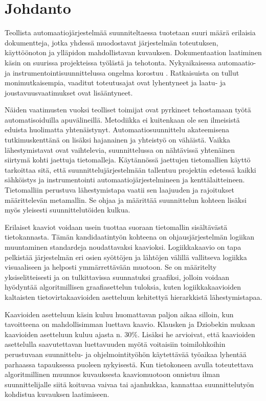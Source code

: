\documentclass[finnish,12pt]{article}
\begin{document}
	\cleardoublepage
	\storeinipagenumber
	\setcounter{page}{1}


	\section{Johdanto}
	\thispagestyle{empty}

Teollista automaatiojärjestelmää suunniteltaessa tuotetaan suuri määrä erilaisia dokumentteja, jotka
yhdessä muodostavat järjestelmän toteutuksen, käyttöönoton ja ylläpidon mahdollistavan kuvauksen.
Dokumentaation laatiminen käsin on suurissa projekteissa työlästä ja tehotonta.
Nykyaikaisessa automaatio- ja instrumentointisuunnittelussa ongelma korostuu \cite{RefWorks:41}.
Ratkaisuista on tullut monimutkaisempia, vaaditut toteutusajat ovat lyhentyneet ja laatu- ja joustavuusvaatimukset ovat lisääntyneet.

Näiden vaatimusten vuoksi teolliset toimijat ovat pyrkineet tehostamaan työtä automatisoiduilla apuvälineillä.
Metodiikka ei kuitenkaan ole sen ilmeisistä eduista huolimatta yhtenäistynyt.
Automaatiosuunnittelu akateemisena tutkimuskenttänä on lisäksi hajanainen ja yhteistyö on vähäistä.
Vaikka lähestymistavat ovat vaihtelevia, suunnittelussa on nähtävissä yhtenäinen siirtymä kohti jaettuja tietomalleja.
Käytännössä jaettujen tietomallien käyttö tarkoittaa sitä, että suunnittelujärjestelmään tallentuu projektin edetessä kaikki sähköistys ja instrumentointi automaatiojärjestelmineen ja kenttälaitteineen.
Tietomalliin perustuva lähestymistapa vaatii sen laajuuden ja rajoitukset määrittelevän metamallin.
Se ohjaa ja määrittää suunnittelun kohteen lisäksi myös yleisesti suunnittelutöiden kulkua.

Erilaiset kaaviot voidaan usein tuottaa suoraan tietomallin sisältävästä tietokannasta.
Tämän kandidaatintyön kohteena on ohjausjärjestelmän logiikan muuntaminen standardeja noudattavaksi kaavioksi.
Logiikkakaavio on tapa pelkistää järjestelmän eri osien syöttöjen ja lähtöjen välillä vallitseva logiikka visuaaliseen ja helposti ymmärrettävään muotoon.
Se on määritelty yksiselitteisesti ja on tulkittavissa suunnatuksi graafiksi, jolloin voidaan hyödyntää algoritmillisen graafiasettelun tuloksia, kuten logiikkakaavioiden kaltaisten tietovirtakaavioiden asetteluun kehitettyä hierarkkistä lähestymistapaa.

Kaavioiden asetteluun käsin kuluu huomattavan paljon aikaa silloin, kun tavoitteena on mahdollisimman luettava kaavio.
Klausken ja Dziobekin mukaan kaavioiden asetteluun kuluu ajasta n. 30\%.
Lisäksi he arvioivat, että kaavioiden asettelulla saavutettavan luettavuuden myötä voitaisiin toimilohkoihin perustuvaan suunnittelu- ja ohjelmointityöhön käytettävää työaikaa lyhentää parhaassa tapauksessa puoleen nykyisestä. \cite{Refworks:63}
Kun tietokoneen avulla toteutettava algoritmillinen muunnos kuvauksesta kaaviomuotoon onnistuu ilman suunnittelijalle siitä koituvaa vaivaa tai ajanhukkaa, kannattaa suunnittelutyön kohdistua kuvauksen laatimiseen.
\end{document}

